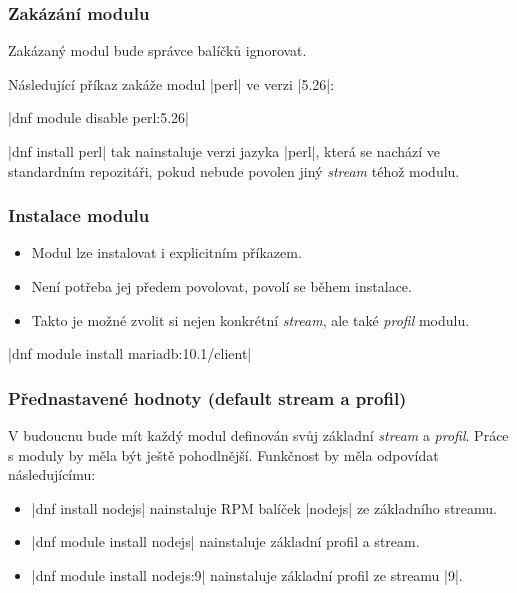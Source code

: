 \documentclass[12pt]{beamer}
\begin{document}
\begin{frame}[fragile]
\frametitle{Zakázání modulu}
Zakázaný modul bude správce balíčků ignorovat. 

Následující příkaz zakáže modul \tc|perl| ve verzi \tc|5.26|:

\begin{center}
	\tc|dnf module disable perl:5.26|
\end{center}

\tc|dnf install perl| tak nainstaluje verzi jazyka \tc|perl|, která se nachází ve standardním repozitáři, pokud nebude povolen jiný \textit{stream} téhož modulu.
\end{frame}

\begin{frame}[fragile]
\frametitle{Instalace modulu}

\begin{itemize}
	\item Modul lze instalovat i explicitním příkazem.
	\item Není potřeba jej předem povolovat, povolí se během instalace.
	\item Takto je možné zvolit si nejen konkrétní \textit{stream}, ale také \textit{profil} modulu.
\end{itemize}

\begin{center}
	\tc|dnf module install mariadb:10.1/client|
\end{center}

\end{frame}

\begin{frame}[fragile]
\frametitle{Přednastavené hodnoty (default stream a profil)}

V budoucnu bude mít každý modul definován svůj základní \textit{stream} a \textit{profil}. Práce s moduly by měla být ještě pohodlnější. Funkčnost by měla odpovídat následujícímu:

\begin{itemize}
	\item \tc|dnf install nodejs| nainstaluje RPM balíček \tc|nodejs| ze základního streamu.
	\item \tc|dnf module install nodejs| nainstaluje základní profil a stream.
	\item \tc|dnf module install nodejs:9| nainstaluje základní profil ze streamu \tc|9|.
\end{itemize}
\end{frame}
\end{document}

